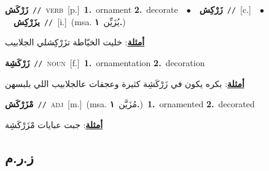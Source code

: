 \documentclass[10pt,a4paper,twoside]{article} %
\begin{document}
\begin{multicols}{2}
{\setlength\topsep{0pt}\textbf{\foreignlanguage{arabic}{زَرْكَش}}\ {\color{gray}\texttt{//}\color{black}}\ \textsc{verb}\ [p.]\ \textbf{1.}~ornament  \textbf{2.}~decorate\ \ $\bullet$\ \ \setlength\topsep{0pt}\textbf{\foreignlanguage{arabic}{زَرْكِش}}\ {\color{gray}\texttt{//}\color{black}}\ [c.]\ \ $\bullet$\ \ \setlength\topsep{0pt}\textbf{\foreignlanguage{arabic}{يزَرْكِش}}\ {\color{gray}\texttt{//}\color{black}}\ [i.]\ \color{gray}(msa. \foreignlanguage{arabic}{يُزَيِّن}~\foreignlanguage{arabic}{\textbf{١.}})\color{black}\  \begin{flushright}\color{gray}\foreignlanguage{arabic}{\textbf{\underline{\foreignlanguage{arabic}{أمثلة}}}: خليت الخيّاطة تزَرْكِشلي الجلابيب}\end{flushright}\color{black}} \vspace{2mm}

{\setlength\topsep{0pt}\textbf{\foreignlanguage{arabic}{زَرْكَشِة}}\ {\color{gray}\texttt{//}\color{black}}\ \textsc{noun}\ [f.]\ \textbf{1.}~ornamentation  \textbf{2.}~decoration\  \begin{flushright}\color{gray}\foreignlanguage{arabic}{\textbf{\underline{\foreignlanguage{arabic}{أمثلة}}}: بكره يكون في زَرْكَشِة كثيرة وعجقات عالجلابيب اللي بلبسهن}\end{flushright}\color{black}} \vspace{2mm}

{\setlength\topsep{0pt}\textbf{\foreignlanguage{arabic}{مْزَرْكَش}}\ {\color{gray}\texttt{//}\color{black}}\ \textsc{adj}\ [m.]\ \color{gray}(msa. \foreignlanguage{arabic}{مُزَيَّن}~\foreignlanguage{arabic}{\textbf{١.}})\color{black}\ \textbf{1.}~ornamented  \textbf{2.}~decorated\  \begin{flushright}\color{gray}\foreignlanguage{arabic}{\textbf{\underline{\foreignlanguage{arabic}{أمثلة}}}: جبت عبايات مْزَرْكَشِة}\end{flushright}\color{black}} \vspace{2mm}

\vspace{-3mm}
\subsection*{\color{blue}\foreignlanguage{arabic}{ز.ر.م}\color{blue}{}} 


\end{multicols}
\end{document}
